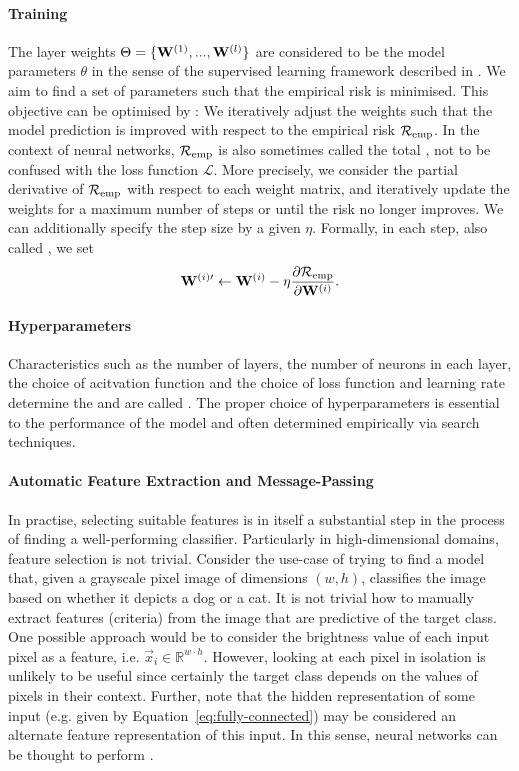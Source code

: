 \documentclass[
	fontsize=10pt, %
	twoside=true, %
	secnumdepth=1, %
  toc=indentunnumbered %
]{kaobook}
\begin{document}
\paragraph{Training} The layer weights $\Theta = \{\mathbf{W}^{(1)}, ...,
\mathbf{W}^{(l)}\}$ are considered to be the model parameters $\theta$ in the sense
of the supervised learning framework described in .
We aim to find a set of parameters such that the empirical risk is minimised.
This objective can be
optimised by : We iteratively adjust the weights
such that the model prediction is improved with respect to the empirical risk
$\mathcal{R}_{\text{emp}}$. In the context of neural networks, $\mathcal{R}_{\text{emp}}$ is also sometimes called the
total , not to be confused with the loss function $\mathcal{L}$. More
precisely, we consider the partial derivative of $\mathcal{R}_{\text{emp}}$ with respect to each
weight matrix, and iteratively update the weights for a maximum number of steps
or until the risk no longer improves. We can additionally specify the step size
by a given  $\eta$. Formally, in each step, also called
, we set
\begin{align*}
\mathbf{W}^{(i)\prime} \gets
\mathbf{W}^{(i)} - \eta \frac{\partial \mathcal{R}_{\text{emp}}}{\partial \mathbf{W}^{(i)}}.
\end{align*}

\paragraph{Hyperparameters} Characteristics such as the number of layers, the
number of neurons in each layer, the choice of acitvation function and the
choice of loss function and learning rate determine the 
and are called . The proper choice of hyperparameters is
essential to the performance of the model and often determined empirically via
search techniques.

\paragraph{Automatic Feature Extraction and Message-Passing}
In practise, selecting suitable features is in itself a substantial
step in the process of finding a well-performing classifier.
%
Particularly in high-dimensional domains, feature selection is not trivial.
Consider the use-case of trying to find a model that, given a grayscale pixel
image of dimensions $(w, h)$, classifies the image based on whether it depicts a
dog or a cat. It is not trivial how to manually extract features (criteria) from
the image that are predictive of the target class. One possible approach
would be to consider the brightness value of each input pixel as a feature, i.e.
$\vec x_i \in \mathbb{R}^{w \cdot h}$. However, looking at each
pixel in isolation is unlikely to be useful since certainly the target class
depends on the values of pixels in their context.
Further, note that the hidden representation of some input (e.g. given by
Equation~\ref{eq:fully-connected}) may be considered an alternate feature representation
of this input. In this sense, neural networks can be thought to perform
. 
\end{document}
